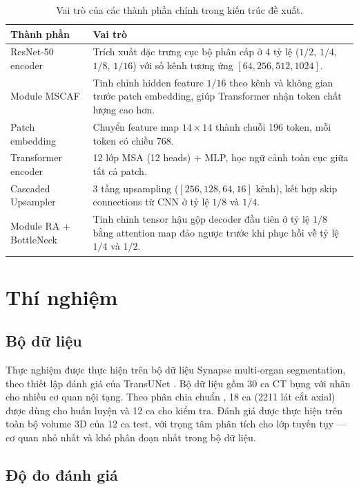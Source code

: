 \documentclass[10pt,a4paper]{article}
\begin{document}
\begin{table}[t]
\centering
\caption{Vai trò của các thành phần chính trong kiến trúc đề xuất.}
\label{tab:method-blocks}
\small
\begin{tabularx}{\textwidth}{p{}Y}
\toprule
\textbf{Thành phần} & \textbf{Vai trò} \\
\midrule
ResNet-50 encoder & Trích xuất đặc trưng cục bộ phân cấp ở 4 tỷ lệ ($1/2$, $1/4$, $1/8$, $1/16$) với số kênh tương ứng $[64, 256, 512, 1024]$. \\
Module MSCAF & Tinh chỉnh hidden feature $1/16$ theo kênh và không gian trước patch embedding, giúp Transformer nhận token chất lượng cao hơn. \\
Patch embedding & Chuyển feature map $14\times14$ thành chuỗi 196 token, mỗi token có chiều 768. \\
Transformer encoder & 12 lớp MSA (12 heads) + MLP, học ngữ cảnh toàn cục giữa tất cả patch. \\
Cascaded Upsampler & 3 tầng upsampling ($[256, 128, 64, 16]$ kênh), kết hợp skip connections từ CNN ở tỷ lệ $1/8$ và $1/4$. \\
Module RA + BottleNeck & Tinh chỉnh tensor hậu gộp decoder đầu tiên ở tỷ lệ $1/8$ bằng attention map đảo ngược trước khi phục hồi về tỷ lệ $1/4$ và $1/2$. \\
\bottomrule
\end{tabularx}
\end{table}

\section{Thí nghiệm}

\subsection{Bộ dữ liệu}

Thực nghiệm được thực hiện trên bộ dữ liệu Synapse multi-organ segmentation, theo thiết lập đánh giá của TransUNet \cite{chen2021transunet}. Bộ dữ liệu gồm 30 ca CT bụng với nhãn cho nhiều cơ quan nội tạng. Theo phân chia chuẩn \cite{chen2021transunet}, 18 ca (2211 lát cắt axial) được dùng cho huấn luyện và 12 ca cho kiểm tra. Đánh giá được thực hiện trên toàn bộ volume 3D của 12 ca test, với trọng tâm phân tích cho lớp tuyến tụy --- cơ quan nhỏ nhất và khó phân đoạn nhất trong bộ dữ liệu.

\subsection{Độ đo đánh giá}
\end{document}
